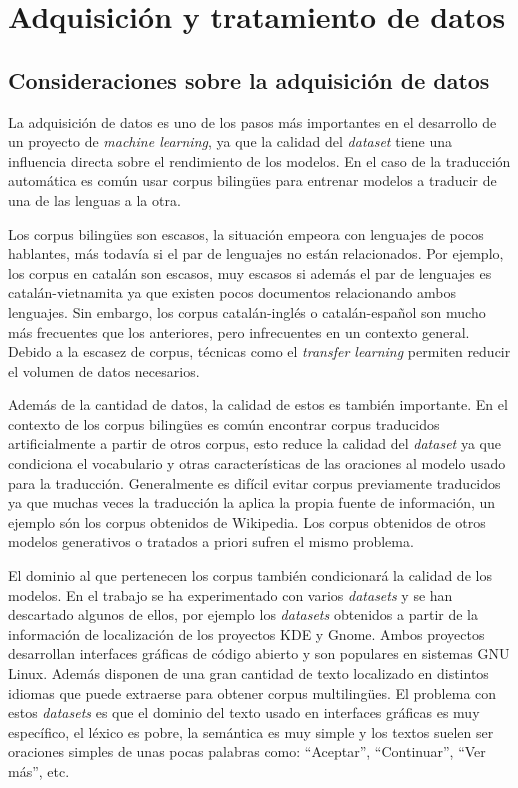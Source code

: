 \chapter{Adquisición y tratamiento de datos}
\section{Consideraciones sobre la adquisición de datos}
La adquisición de datos es uno de los pasos más importantes en el desarrollo de un proyecto de \textit{machine learning}, ya que la calidad del \textit{dataset} tiene una influencia directa sobre el rendimiento de los modelos. En el caso de la traducción automática es común usar corpus biling{\"u}es para entrenar modelos a traducir de una de las lenguas a la otra.

Los corpus biling{\"u}es son escasos, la situación empeora con lenguajes de pocos hablantes, más todavía si el par de lenguajes no están relacionados. Por ejemplo, los corpus en catalán son escasos, muy escasos si además el par de lenguajes es catalán-vietnamita ya que existen pocos documentos relacionando ambos lenguajes. Sin embargo, los corpus catalán-inglés o catalán-español son mucho más frecuentes que los anteriores, pero infrecuentes en un contexto general.
Debido a la escasez de corpus, técnicas como el \textit{transfer learning} permiten reducir el volumen de datos necesarios.

Además de la cantidad de datos, la calidad de estos es también importante. En el contexto de los corpus biling{\"u}es es común encontrar corpus traducidos artificialmente a partir de otros corpus, esto reduce la calidad del \textit{dataset} ya que condiciona el vocabulario y otras características de las oraciones al modelo usado para la traducción. Generalmente es difícil evitar corpus previamente traducidos ya que muchas veces la traducción la aplica la propia fuente de información, un ejemplo són los corpus obtenidos de Wikipedia. Los corpus obtenidos de otros modelos generativos o tratados a priori sufren el mismo problema.

El dominio al que pertenecen los corpus también condicionará la calidad de los modelos. En el trabajo se ha experimentado con varios \textit{datasets} y se han descartado algunos de ellos, por ejemplo los \textit{datasets} obtenidos a partir de la información de localización de los proyectos KDE y Gnome. Ambos proyectos desarrollan interfaces gráficas de código abierto y son populares en sistemas GNU Linux. Además disponen de una gran cantidad de texto localizado en distintos idiomas que puede extraerse para obtener corpus multiling{\"u}es. El problema con estos \textit{datasets} es que el dominio del texto usado en interfaces gráficas es muy específico, el léxico es pobre, la semántica es muy simple y los textos suelen ser oraciones simples de unas pocas palabras como: ``Aceptar'', ``Continuar'', ``Ver más'', etc.

